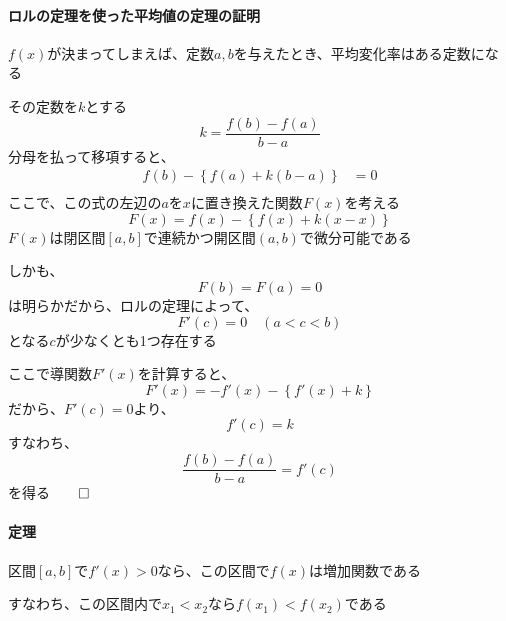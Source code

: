 \documentclass[../book_infinite_continuous_math]{subfiles}
\begin{document}
\paragraph{ロルの定理を使った平均値の定理の証明}\quad

$f(x)$が決まってしまえば、定数$a, b$を与えたとき、平均変化率はある定数になる

その定数を$k$とする
\begin{equation*}
  k = \frac{f(b) - f(a)}{b - a}
\end{equation*}
分母を払って移項すると、
\begin{align*}
  f(b) - \left\{ f(a) + k(b - a) \right\} & = 0 \\
\end{align*}
ここで、この式の左辺の$a$を$x$に置き換えた関数$F(x)$を考える
\begin{equation*}
  F(x) = f(x) - \left\{f(x) + k(x - x)\right\}
\end{equation*}
$F(x)$は閉区間$[a, b]$で連続かつ開区間$(a, b)$で微分可能である

しかも、
\begin{equation*}
  F(b) = F(a) = 0
\end{equation*}
は明らかだから、ロルの定理によって、
\begin{equation*}
  F'(c) = 0 \quad (a < c < b)
\end{equation*}
となる$c$が少なくとも1つ存在する

ここで導関数$F'(x)$を計算すると、
\begin{equation*}
  F'(x) = - f'(x) - \left\{ f'(x) + k \right\}
\end{equation*}
だから、$F'(c) = 0$より、
\begin{equation*}
  f'(c) = k
\end{equation*}
すなわち、
\begin{equation*}
  \frac{f(b) - f(a)}{b - a} = f'(c)
\end{equation*}
を得る$\qed$

\sectionline

\begin{oframed}
  \paragraph{定理}
  区間$[a, b]$で$f'(x) > 0$なら、この区間で$f(x)$は増加関数である

  すなわち、この区間内で$x_1 < x_2$なら$f(x_1) < f(x_2)$である
\end{oframed}
\end{document}
